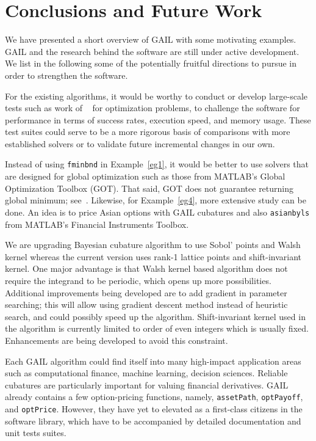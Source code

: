 \section{Conclusions and Future Work}
\label{sec:concl}
We have presented a short overview of GAIL with some motivating
examples. GAIL and the research behind the software are still under active
development. We list in the following some of the potentially fruitful
directions to pursue in order to strengthen the software.

For the existing algorithms, it would be worthy to conduct or develop
large-scale tests such as work of
~\cite{dolan2002benchmarking,floudas2013handbook} for optimization
problems, to challenge the software for performance in terms of success
rates, execution speed, and memory usage. These test suites could serve to
be a more rigorous basis of comparisons with more established solvers  or
to validate future incremental changes in our own.  

Instead of using \texttt{fminbnd} in Example~\ref{eg1}, it would be better
to use solvers that are designed for global optimization such as those from
 MATLAB's Global Optimization Toolbox (GOT). That said, GOT does not
guarantee returning global minimum; see~\cite{GOT}. Likewise, for 
Example~\ref{eg4}, more extensive study can be done. An
idea is to price Asian options with GAIL cubatures and also
\texttt{asianbyls} from MATLAB's Financial Instruments Toolbox.

We are upgrading Bayesian cubature algorithm to use Sobol' points and Walsh
kernel whereas the current version uses rank-1 lattice points and
shift-invariant kernel. One major advantage is that Walsh kernel based
algorithm does not require the integrand to be periodic, which opens up
more possibilities. Additional improvements being developed are to add
gradient in parameter searching; this will allow using gradient descent
method instead of heuristic search, and could possibly speed up the algorithm.
Shift-invariant kernel used in the algorithm is currently limited to order
of even integers which is usually fixed. Enhancements are being developed
to avoid this constraint.

Each GAIL algorithm could find itself into many high-impact application
areas such as computational finance, machine learning, decision sciences.
Reliable cubatures are particularly important for valuing financial
derivatives. GAIL already contains a few option-pricing functions,  
namely, \texttt{assetPath}, \texttt{optPayoff}, and  \texttt{optPrice}. 
However, they have yet to elevated as a first-class citizens in
the software library, which have to be accompanied by detailed documentation
and unit tests suites.

